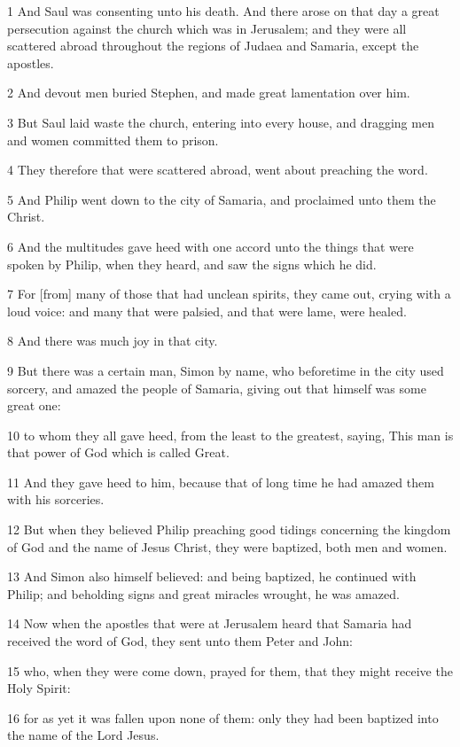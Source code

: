 \par 1 And Saul was consenting unto his death. And there arose on that day a great persecution against the church which was in Jerusalem; and they were all scattered abroad throughout the regions of Judaea and Samaria, except the apostles.
\par 2 And devout men buried Stephen, and made great lamentation over him.
\par 3 But Saul laid waste the church, entering into every house, and dragging men and women committed them to prison.
\par 4 They therefore that were scattered abroad, went about preaching the word.
\par 5 And Philip went down to the city of Samaria, and proclaimed unto them the Christ.
\par 6 And the multitudes gave heed with one accord unto the things that were spoken by Philip, when they heard, and saw the signs which he did.
\par 7 For [from] many of those that had unclean spirits, they came out, crying with a loud voice: and many that were palsied, and that were lame, were healed.
\par 8 And there was much joy in that city.
\par 9 But there was a certain man, Simon by name, who beforetime in the city used sorcery, and amazed the people of Samaria, giving out that himself was some great one:
\par 10 to whom they all gave heed, from the least to the greatest, saying, This man is that power of God which is called Great.
\par 11 And they gave heed to him, because that of long time he had amazed them with his sorceries.
\par 12 But when they believed Philip preaching good tidings concerning the kingdom of God and the name of Jesus Christ, they were baptized, both men and women.
\par 13 And Simon also himself believed: and being baptized, he continued with Philip; and beholding signs and great miracles wrought, he was amazed.
\par 14 Now when the apostles that were at Jerusalem heard that Samaria had received the word of God, they sent unto them Peter and John:
\par 15 who, when they were come down, prayed for them, that they might receive the Holy Spirit:
\par 16 for as yet it was fallen upon none of them: only they had been baptized into the name of the Lord Jesus.
